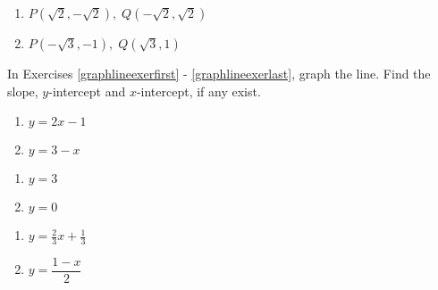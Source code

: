 \documentclass{ximera}
\begin{document}
\begin{multicols}{2}
\begin{enumerate}
\setcounter{enumi}{\value{HW}}

\item $P\left(\sqrt{2}, -\sqrt{2} \right), \; Q\left(-\sqrt{2}, \sqrt{2} \right)$
\item $P\left(-\sqrt{3}, -1 \right), \; Q\left(\sqrt{3}, 1 \right)$ \label{twopointsgivenlinelast}

\setcounter{HW}{\value{enumi}}
\end{enumerate}
\end{multicols}

In Exercises \ref{graphlineexerfirst} - \ref{graphlineexerlast}, graph the line.  Find the slope, $y$-intercept and $x$-intercept, if any exist.

\begin{multicols}{2}
\begin{enumerate}
\setcounter{enumi}{\value{HW}}

\item $y = 2x - 1$ \label{graphlineexerfirst}
\item $y = 3 - x$

\setcounter{HW}{\value{enumi}}
\end{enumerate}
\end{multicols}

\begin{multicols}{2}
\begin{enumerate}
\setcounter{enumi}{\value{HW}}

\item $y = 3$
\item $y = 0$

\setcounter{HW}{\value{enumi}}
\end{enumerate}
\end{multicols}

\begin{multicols}{2}
\begin{enumerate}
\setcounter{enumi}{\value{HW}}

\item $y = \frac{2}{3} x + \frac{1}{3}$ 
\item $y = \dfrac{1-x}{2}$ \label{graphlineexerlast}

\setcounter{HW}{\value{enumi}}
\end{enumerate}
\end{multicols}
\end{document}

